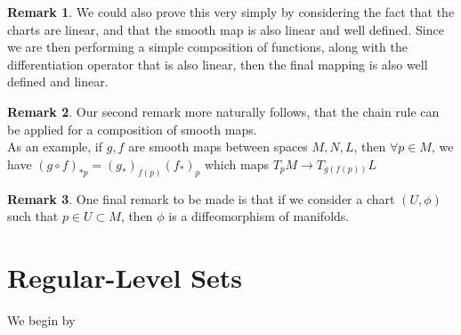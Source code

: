 \documentclass[12pt]{book}
\theoremstyle{definition}
\newtheorem*{remark}{Remark}
\begin{document}
\begin{remark}
    We could also prove this very simply by considering the fact that the charts are linear, and that the smooth map is also linear and well defined. Since we are then performing a simple composition of functions, along with the differentiation operator that is also linear, then the final mapping is also well defined and linear.
\end{remark}
\begin{remark}
    Our second remark more naturally follows, that the chain rule can be applied for a composition of smooth maps. \\ As an example, if $g, f$ are smooth maps between spaces $M, N, L$, then $\forall p \in M$, we have $(g \circ f)_{*p} = (g_*)_{f(p)}(f_*)_p$ which maps $T_pM \to T_{g(f(p))}L$
\end{remark}
\begin{remark}
    One final remark to be made is that if we consider a chart $(U, \phi)$ such that $p \in U \subset M$, then $\phi$ is a diffeomorphism of manifolds.
\end{remark}

\section{Regular-Level Sets}
We begin by 
\end{document}
